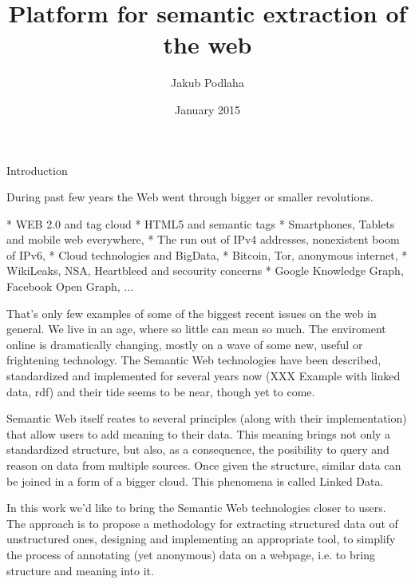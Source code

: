 
\worktype [M/EN]
\title {Platform for semantic extraction of the web}
\author {Jakub Podlaha}
\date {January 2015}
\makefront



\chap Introduction

During past few years the Web went through bigger or smaller revolutions. 

\begitems
  * WEB 2.0 and tag cloud
  * HTML5 and semantic tags
  * Smartphones, Tablets and mobile web everywhere, 
  * The run out of IPv4 addresses, nonexistent boom of IPv6, 
  * Cloud technologies and BigData, 
  * Bitcoin, Tor, anonymous internet, 
  * WikiLeaks, NSA, Heartbleed and secourity concerns
  * Google Knowledge Graph, Facebook Open Graph, ...
\enditems

That's only few examples of some of the biggest recent issues on the web in
general. We live in an age, where so little can mean so much. The enviroment
online is dramatically changing, mostly on a wave of some new, useful or
frightening technology. The Semantic Web technologies have been described,
standardized and implemented for several years now  (XXX Example with linked
data, rdf) and their tide seems to be near, though yet to come.

Semantic Web itself reates to several principles (along with their
implementation) that allow users to add meaning to their data. This meaning
brings not only a standardized structure, but also, as a consequence, the
posibility to query and reason on data from multiple sources. Once given the
structure, similar data can be joined in a form of a bigger cloud. This
phenomena is called Linked Data. 

In this work we'd like to bring the Semantic Web technologies closer to users.
The approach is to propose a methodology for extracting structured data out of
unstructured ones, designing and implementing an appropriate tool, to simplify
the process of annotating (yet anonymous) data on a webpage, i.e. to bring
structure and meaning into it. 



